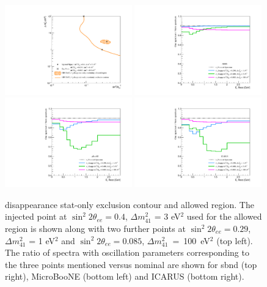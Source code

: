 \begin{figure}[h!]
    \centering
    \includegraphics[width = 0.49\textwidth]{figures-chap6/overlays/nue_disapp_stat_osc_markers.pdf}
    \includegraphics[width = 0.49\textwidth]{figures-chap6/spectra/nue_disapp_spectra_ratio_sbnd.pdf}
    \includegraphics[width = 0.49\textwidth]{figures-chap6/spectra/nue_disapp_spectra_ratio_uboone.pdf}
    \includegraphics[width = 0.49\textwidth]{figures-chap6/spectra/nue_disapp_spectra_ratio_icarus.pdf}
    \caption[Ratio of \nue disappearance spectra with the oscillation parameters shown on the statistical only contour.]{\nue disappearance stat-only exclusion contour and allowed region. The injected point at $\sin^2{2\theta_{ee}} = 0.4$, $\Delta m^2_{41}$ = 3 eV$^2$ used for the allowed region is shown along with two further points at $\sin^2{2\theta_{ee}} = 0.29$, $\Delta m^2_{41}$ = 1 eV$^2$ and \mbox{$\sin^2{2\theta_{ee}} = 0.085$}, \mbox{$\Delta m^2_{41}$ = 100 eV$^2$} (top left). The ratio of spectra with oscillation parameters corresponding to the three points mentioned versus nominal are shown for \gls{sbnd} (top right), MicroBooNE (bottom left) and ICARUS (bottom right).}
    \label{fig:nue_disapp_spectra_ratios}
\end{figure}




